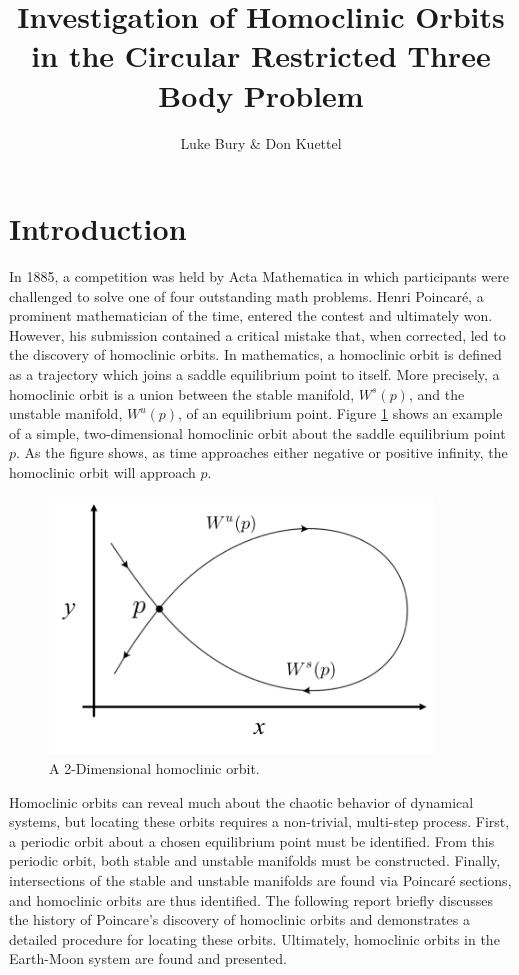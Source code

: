 \documentclass[11pt]{article} %
\title{Investigation of Homoclinic Orbits in the Circular Restricted Three Body Problem}
\author{Luke Bury \& Don Kuettel}
\begin{document}
\maketitle
\section*{Introduction}
In 1885, a competition was held by Acta Mathematica in which participants were challenged to solve one of four outstanding math problems. Henri Poincaré, a prominent mathematician of the time, entered the contest and ultimately won. However, his submission contained a critical mistake that, when corrected, led to the discovery of homoclinic orbits. In mathematics, a homoclinic orbit is defined as a trajectory which joins a saddle equilibrium point to itself. More precisely, a homoclinic orbit is a union between the stable manifold, $W^s(p)$, and the unstable manifold, $W^u(p)$, of an equilibrium point. Figure \ref{f:homoclinic_example} shows an example of a simple, two-dimensional homoclinic orbit about the saddle equilibrium point $p$. As the figure shows, as time approaches either negative or positive infinity, the homoclinic orbit will approach $p$. 

\begin{figure}[H]
    \centering
    \includegraphics[width=4in]{homoclinic_orbit.png}
    \caption{A 2-Dimensional homoclinic orbit.}
    \label{f:homoclinic_example}
\end{figure}

Homoclinic orbits can reveal much about the chaotic behavior of dynamical systems, but locating these orbits requires a non-trivial, multi-step process. First, a periodic orbit about a chosen equilibrium point must be identified. From this periodic orbit, both stable and unstable manifolds must be constructed. Finally, intersections of the stable and unstable manifolds are found via Poincaré sections, and homoclinic orbits are thus identified. The following report briefly discusses the history of Poincare's discovery of homoclinic orbits and demonstrates a detailed procedure for locating these orbits. Ultimately, homoclinic orbits in the Earth-Moon system are found and presented.
\end{document}
